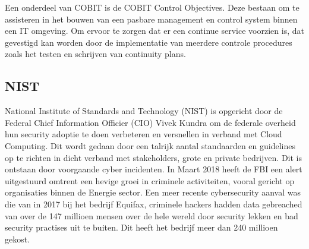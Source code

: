 Een onderdeel van COBIT is de COBIT Control Objectives. Deze bestaan om te assisteren in het bouwen van een pasbare management en control system binnen een IT omgeving. \autocite{Khther2013} 
Om ervoor te zorgen dat er een continue service voorzien is, dat gevestigd kan worden door de implementatie van meerdere controle procedures zoals het testen en schrijven van continuity plans. \autocite{Khther2013} 


\subsection{NIST}
National Institute of Standards and Technology (NIST) is opgericht door de Federal Chief Information Officier (CIO) Vivek Kundra om de federale overheid hun security adoptie te doen verbeteren en versnellen in verband met Cloud Computing.
Dit wordt gedaan door een talrijk aantal standaarden en guidelines op te richten in dicht verband met stakeholders, grote en private bedrijven. \autocite{Hogan2011}
Dit is ontstaan door voorgaande cyber incidenten. In Maart 2018 heeft de FBI een alert uitgestuurd omtrent een hevige groei in criminele activiteiten, vooral gericht op organisaties binnen de Energie sector.
Een meer recente cybersecurity aanval was die van in 2017 bij het bedrijf Equifax, criminele hackers hadden data gebreached van over de 147 millioen mensen over de hele wereld door security lekken en bad security practises uit te buiten. Dit heeft het bedrijf meer dan 240 millioen gekost. \autocite{Calder2018}

